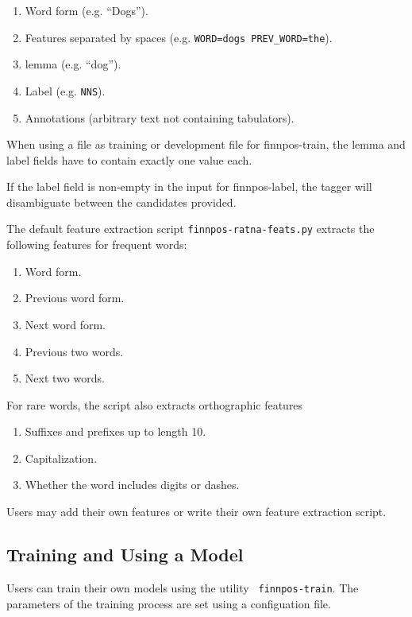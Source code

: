 \documentclass{llncs}
\begin{document}
\begin{enumerate}
  \item  Word form (e.g. ``Dogs'').
  \item  Features separated by spaces (e.g. \verb|WORD=dogs PREV_WORD=the|).
  \item  lemma (e.g. ``dog'').
  \item  Label (e.g. \verb|NNS|).
  \item  Annotations (arbitrary text not containing tabulators).
\end{enumerate}

When using a file as training or development file for finnpos-train, the lemma and label fields have to contain exactly one value each.

If the label field is non-empty in the input for finnpos-label, the tagger will disambiguate between the candidates provided.

The default feature extraction script {\tt finnpos-ratna-feats.py}
extracts the following features for frequent words:

\begin{enumerate}
\item Word form.
\item Previous word form.
\item Next word form.
\item Previous two words.
\item Next two words.
\end{enumerate}

For rare words, the script also extracts orthographic features

\begin{enumerate}
\item Suffixes and prefixes up to length 10.
\item Capitalization.
\item Whether the word includes digits or dashes.
\end{enumerate}

Users may add their own features or write their own feature extraction script.

\subsection{Training and Using a Model}

Users can train their own models using the utility {\tt
  finnpos-train}. The parameters of the training process are set using
a configuation file.
\end{document}
